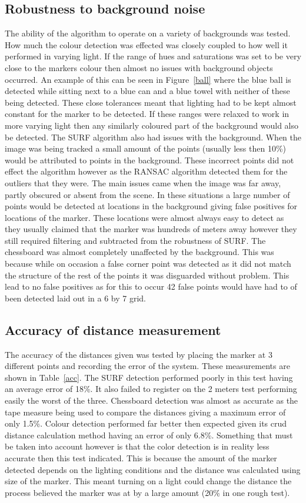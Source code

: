 \subsection{Robustness to background noise}
The ability of the algorithm to operate on a variety of backgrounds was tested. How much the colour detection was effected was closely coupled to how well it performed in varying light. If the range of hues and saturations was set to be very close to the markers colour then almost no issues with background objects occurred. An example of this can be seen in Figure~\ref{ball} where the blue ball is detected while sitting next to a blue can and a blue towel with neither of these being detected. These close tolerances meant that lighting had to be kept almost constant for the marker to be detected. If these ranges were relaxed to work in more varying light then any similarly coloured part of the background would also be detected. The SURF algorithm also had issues with the background. When the image was being tracked a small amount of the points (usually less then 10\%) would be attributed to points in the background. These incorrect points did not effect the algorithm however as the RANSAC algorithm detected them for the outliers that they were. The main issues came when the image was far away, partly obscured or absent from the scene. In these situations a large number of points would be detected at locations in the background giving false positives for locations of the marker. These locations were almost always easy to detect as they usually claimed that the marker was hundreds of meters away however they still required filtering and subtracted from the robustness of SURF. The chessboard was almost completely unaffected by the background. This was because while on occasion a false corner point was detected as it did not match the structure of the rest of the points it was disguarded without problem. This lead to no false positives as for this to occur 42 false points would have had to of been detected laid out in a 6 by 7 grid.

\subsection{Accuracy of distance measurement}
The accuracy of the distances given was tested by placing the marker at 3 different points and recording the error of the system. These measurements are shown in Table~\ref{acc}. The SURF detection performed poorly in this test having an average error of 18\%. It also failed to register on the 2 meters test performing easily the worst of the three. Chessboard detection was almost as accurate as the tape measure being used to compare the distances giving a maximum error of only 1.5\%. Colour detection performed far better then expected given its crud distance calculation method having an error of only 6.8\%. Something that must be taken into account however is that the color detection is in reality less accurate then this test indicated. This is because the amount of the marker detected depends on the lighting conditions and the distance was calculated using size of the marker. This meant turning on a light could change the distance the process believed the marker was at by a large amount (20\% in one rough test).


